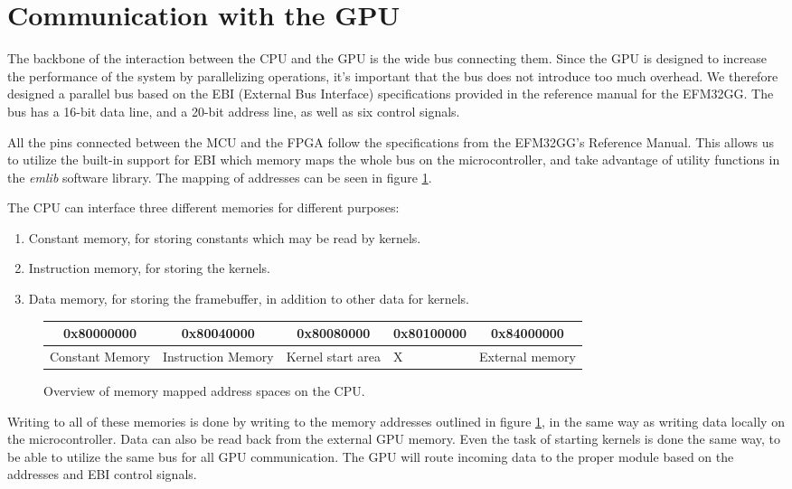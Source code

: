 \documentclass[../main/report.tex]{subfiles}
\begin{document}
\section{Communication with the GPU}

The backbone of the interaction between the CPU and the GPU is the wide bus connecting them.
Since the GPU is designed to increase the performance of the system by parallelizing operations,
it's important that the bus does not introduce too much overhead.
We therefore designed a parallel bus based on the EBI (External Bus Interface) specifications provided
in the reference manual for the EFM32GG\cite[p.175]{efm32gg}.
The bus has a 16-bit data line, and a 20-bit address line, as well as six control signals.

All the pins connected between the MCU and the FPGA follow the specifications from the EFM32GG's Reference Manual\cite[p.175]{efm32gg}.
This allows us to utilize the built-in support for EBI which memory maps the whole bus on the microcontroller, and take advantage of utility functions in the \emph{emlib} software library\cite{emlib}.
The mapping of addresses can be seen in figure \ref{fig:memory_map}.

The CPU can interface three different memories for different purposes:

\begin{enumerate}
    \item Constant memory, for storing constants which may be read by kernels.
    \item Instruction memory, for storing the kernels.
    \item Data memory, for storing the framebuffer, in addition to other data for kernels.
\end{enumerate}

\begin{figure}[H]
    \centering
    \begin{tabularx}{\textwidth}{|X|X|X|X|X|}
    \multicolumn{1}{c}{0x80000000} & \multicolumn{1}{c}{0x80040000} & \multicolumn{1}{c}{0x80080000} & \multicolumn{1}{c}{0x80100000} & \multicolumn{1}{c}{0x84000000} \\ \hline
    Constant Memory & Instruction Memory & Kernel start area & X & External memory \\ \hline
    \end{tabularx}
    \caption{Overview of memory mapped address spaces on the CPU.}
    \label{fig:memory_map}
\end{figure}

Writing to all of these memories is done by writing to the memory addresses
outlined in figure \ref{fig:memory_map},
in the same way as writing data locally on the microcontroller.
Data can also be read back from the external GPU memory.
Even the task of starting kernels is done the same way, to be able to utilize the same bus for all GPU communication.
The GPU will route incoming data to the proper module based on the addresses and EBI control signals.
\end{document}
